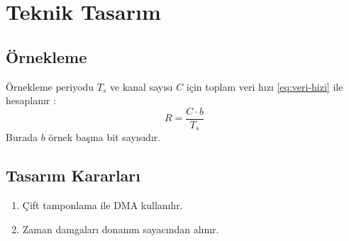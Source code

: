 \section{Teknik Tasarım}
\label{sec:tasarim}

\subsection{Örnekleme}
Örnekleme periyodu $T_s$ ve kanal sayısı $C$ için toplam veri hızı
\cref{eq:veri-hizi} ile hesaplanır \parencite{knuth1984texbook}:
\begin{equation}
  R = \frac{C \cdot b}{T_s}
  \label{eq:veri-hizi}
\end{equation}
Burada $b$ örnek başına bit sayısıdır.

\subsection{Tasarım Kararları}
\begin{enumerate}[label=TK-\arabic*]
  \item Çift tamponlama ile DMA kullanılır.
  \item Zaman damgaları donanım sayacından alınır.
\end{enumerate}
